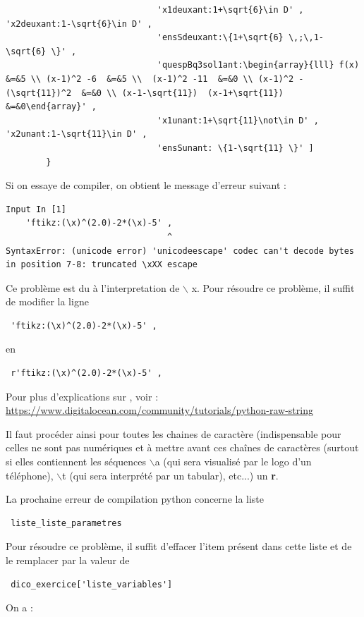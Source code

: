 {\begin{verbatim}
                              'x1deuxant:1+\sqrt{6}\in D' , 'x2deuxant:1-\sqrt{6}\in D' , 
                              'ensSdeuxant:\{1+\sqrt{6} \,;\,1-\sqrt{6} \}' , 
                              'quespBq3sol1ant:\begin{array}{lll} f(x) &=&5 \\ (x-1)^2 -6  &=&5 \\  (x-1)^2 -11  &=&0 \\ (x-1)^2 -(\sqrt{11})^2  &=&0 \\ (x-1-\sqrt{11})  (x-1+\sqrt{11}) &=&0\end{array}' ,
                              'x1unant:1+\sqrt{11}\not\in D' , 'x2unant:1-\sqrt{11}\in D' , 
                              'ensSunant: \{1-\sqrt{11} \}' ]
        }
\end{verbatim}

Si on essaye de compiler, on obtient le message d'erreur suivant : 

\begin{verbatim} 
Input In [1]
    'ftikz:(\x)^(2.0)-2*(\x)-5' ,
                                ^
SyntaxError: (unicode error) 'unicodeescape' codec can't decode bytes in position 7-8: truncated \xXX escape 
\end{verbatim}

Ce problème est du à l'interpretation de $\backslash$ x. Pour résoudre ce problème, il suffit de modifier la ligne
\begin{verbatim}
 'ftikz:(\x)^(2.0)-2*(\x)-5' , 
\end{verbatim}
en 
\begin{verbatim}
 r'ftikz:(\x)^(2.0)-2*(\x)-5' , 
\end{verbatim}

Pour plus d'explications sur , voir : \url{https://www.digitalocean.com/community/tutorials/python-raw-string}

Il faut procéder ainsi pour toutes les chaines de caractère (indispensable pour celles ne sont pas numériques et à mettre avant ces chaînes de caractères 
(surtout si elles contiennent les séquences $\backslash$a (qui sera visualisé par le logo d'un téléphone), 
$\backslash$t (qui sera interprété par un tabular), etc...) un {\bf r}. 


La prochaine erreur de compilation python concerne la liste 
\begin{verbatim}
 liste_liste_parametres
\end{verbatim}

Pour résoudre ce problème, il suffit d'effacer l'item présent dans cette liste et de le remplacer par la valeur de 
\begin{verbatim}
 dico_exercice['liste_variables'] 
\end{verbatim}
On a : 

}
